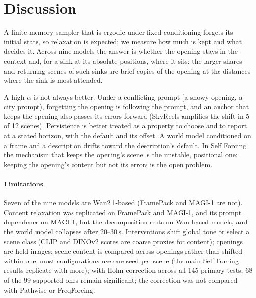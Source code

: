 \section{Discussion}\label{sec:discussion}
A finite-memory sampler that is ergodic under fixed conditioning forgets its initial state, so relaxation is expected;
we measure how much is kept and what decides it.
Across nine models the answer is whether the opening stays in the context and, for a sink at its absolute positions,
where it sits: the larger shares and returning scenes of such sinks are brief copies of the opening at the distances
where the sink is most attended.

A high $\alpha$ is not always better. Under a conflicting prompt (a snowy opening, a city prompt), forgetting the
opening is following the prompt, and an anchor that keeps the opening also passes its errors forward (SkyReels
amplifies the shift in 5 of 12 scenes). Persistence is better treated as a property to choose and to report at a stated
horizon, with the default and its offset. A world model conditioned on a frame and a description drifts toward the description's default. In Self Forcing the
mechanism that keeps the opening's scene is the unstable, positional one: keeping the opening's content but not
its errors is the open problem.

\paragraph{Limitations.} Seven of the nine models are Wan2.1-based (FramePack and MAGI-1 are not). Content relaxation was replicated on FramePack and MAGI-1, and its prompt dependence on MAGI-1,
but the decomposition rests on Wan-based models, and the world model collapses after 20--30\,s. Interventions shift global tone or select a scene class (CLIP and DINOv2 scores are coarse proxies for content); openings are held images; scene content is compared across openings rather than shifted within one; most configurations use one seed per scene (the main Self Forcing results replicate with more); with Holm correction across all 145 primary tests, 68 of the 99
supported ones remain significant; the correction was not compared with Pathwise or FreqForcing.
